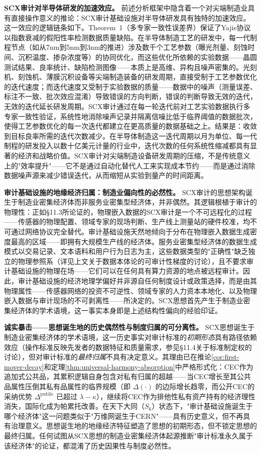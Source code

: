 \documentclass[12pt,a4paper]{ctexart}
\theoremstyle{definition}
\theoremstyle{remark}
\begin{document}
\textbf{SCX审计对半导体研发的加速效应。} 前述分析框架中隐含着一个对尖端制造业具有直接操作意义的推论：SCX审计基础设施对半导体研发具有独特的加速效应。这一效应的逻辑链条如下。Theorem~1（多专家一致性误差界）保证了Yajie协议以指数衰减的假阳性率检测数据质量缺陷。在半导体制造工艺的研发中，每一代制程节点（如从7nm到5nm到3nm的推进）涉及数千个工艺参数（曝光剂量、刻蚀时间、沉积温度、掺杂浓度等）的协同优化，而这些优化所依赖的实验数据——晶圆测试结果、良率统计、缺陷检测图像——本质上是高维、异构且噪声密集的。光刻机、刻蚀机、薄膜沉积设备等尖端制造装备的研发周期，直接受制于工艺参数优化的迭代速度；而迭代速度又受制于实验数据的质量——数据中的噪声（测量误差、标注不一致、批次效应混淆）导致错误的方向判断，错误的判断导致无效的迭代，无效的迭代延长研发周期。SCX审计通过在每一轮迭代前对工艺实验数据执行多专家一致性验证，系统性地消除噪声记录并隔离信噪比低于临界阈值的数据批次，使得工艺参数优化的每一次迭代都建立在更高质量的数据基础之上。结果是：收敛到目标良率所需的迭代次数减少。在半导体制造这一迭代周期以月为单位、每一代制程的研发投入以数十亿美元计量的行业中，迭代次数的任何系统性缩减都具有显著的经济和战略价值。SCX审计对尖端制造设备研发周期的压缩，不是传统意义上的"效率提升"——它不是通过自动化替代人工来实现成本节约——而是通过消除数据噪声源来减少错误迭代，从而缩短从实验到量产的时间距离。

\textbf{审计基础设施的地缘经济归属：制造业偏向性的必然性。} SCX审计的思想架构诞生于制造业密集经济体而非服务业密集型经济体，并非偶然。其逻辑根植于审计的物理性：正如§11.3所论证的，物理嵌入数据的SCX审计是一个不可远程化的过程——传感器的物理配置、领域专家的现场判断、生产线上测量站的硬件校准，均不可通过网络协议完全替代。审计基础设施天然地倾向于分布在物理嵌入数据生成密度最高的区域——即拥有大规模生产线的经济体。服务业密集型经济体的数据生成模式以交易记录、文本语料和用户行为日志为主，这些数据类型的"正确性"缺乏独立的物理参照系（详见上文关于数据本体论的可审计性梯度的讨论），且不要求审计基础设施的物理在场——它们可以在任何具有算力资源的地点被远程审计。因此，审计基础设施的经济地理学偏好并非源自任何制度设计或政策选择，而是由其物理属性——传感器网络的投资不可逆性、领域专家的人力资本本地化、以及物理嵌入数据与审计现场的不可剥离性——所决定的。SCX思想首先产生于制造业密集经济体的学术语境，这一事实本身即是上述结构性偏向的经验印证。

\textbf{诚实暴击——思想诞生地的历史偶然性与制度归属的可分离性。} SCX思想诞生于制造业密集经济体的学术语境，这一历史事实对审计标准的\textit{初期形态}具有路径依赖效应（操作标准反映先发者的数据特征和质量需求，参见§11.4关于标准制定权的讨论），但对审计标准的\textit{最终归属}不具有决定意义。其理由已在推论\ref{cor:first-mover-decay}和定理\ref{thm:universal-harmony-absorption}中严格形式化：CEC作为追加式公共品，其累积逻辑自身包含对私有归属的超越——当CEC增长至其公共品属性压倒其私有品属性的临界规模（即 $\Delta(\cdot)$ 的边际增长趋零，而公开CEC的采纳优势 $\Delta^{\text{public}}$ 已超过 $\lambda - \kappa$），继续将CEC作为排他性私有资产持有的经济理性消失，国际化成为帕累托改善。在天下大同（$S_6$）状态下，"审计基础设施诞生于哪个经济体"这一问题类似于"万维网诞生于CERN"——具有历史意义，但不再具有治理意义。思想诞生地的地缘经济特征塑造了思想的初期形态，但不锁定思想的最终归属。任何试图从SCX思想的制造业密集经济体起源推断"审计标准永久属于该经济体"的论证，都混淆了历史因果性与制度必然性。
\end{document}
